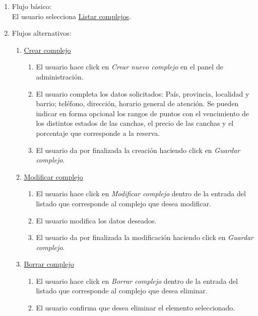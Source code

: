 \documentclass[a4paper,11pt]{article}
\begin{document}
\begin{enumerate}
\begin{enumerate}
        \item Flujo básico:\\
            El usuario selecciona \underline{Listar complejos}.
        \item Flujos alternativos:\\
            \begin{enumerate}
                \item \underline{Crear complejo} \\
                \begin{enumerate}
                    \item El usuario hace click en \textit{Crear nuevo complejo}
                    en el panel de administración.
                    \item El usuario completa los datos solicitados: País, 
                    provincia, localidad y barrio; teléfono, dirección, horario 
                    general de atención.
                    Se pueden indicar en forma opcional los rangos de puntos con
                    el vencimiento de los distintos estados de las canchas, el 
                    precio de las canchas y el porcentaje que corresponde a la
                    reserva.
                    \item El usuario da por finalizada la creación haciendo click
                    en \textit{Guardar complejo}.
                \end{enumerate}
                \item \underline{Modificar complejo} \\
                \begin{enumerate}
                    \item El usuario hace click en \textit{Modificar complejo} 
                    dentro de la entrada del listado que corresponde al complejo 
                    que desea modificar.
                    \item El usuario modifica los datos deseados.
                    \item El usuario da por finalizada la modificación haciendo 
                    click en \textit{Guardar complejo}.
                \end{enumerate}
                \item \underline{Borrar complejo}
                \begin{enumerate}
                    \item El usuario hace click en \textit{Borrar complejo}
                    dentro de la entrada del listado que corresponde al complejo
                     que desea eliminar.
                    \item El usuario confirma que desea eliminar el elemento
                    seleccionado.
                \end{enumerate}
            \end{enumerate}
    \end{enumerate}


\end{enumerate}
\end{document}
